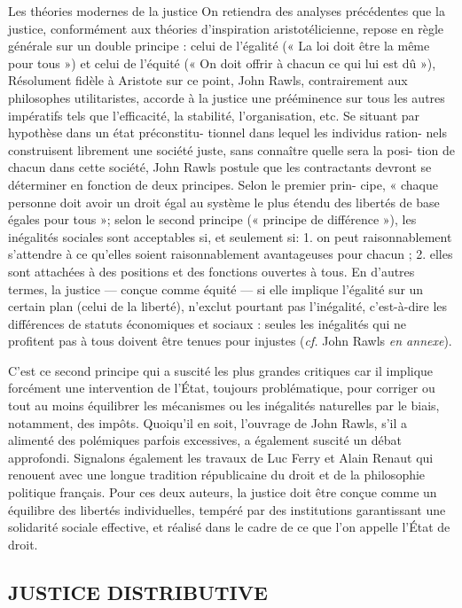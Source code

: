 Les théories modernes de la justice
On retiendra des analyses précédentes
que la justice, conformément aux théories d'inspiration aristotélicienne, repose
en règle générale sur un double principe : celui de l'égalité (« La loi doit être
la même pour tous ») et celui de l’équité
(« On doit offrir à chacun ce qui lui est
dû »), Résolument fidèle à Aristote sur ce
point, John Rawls, contrairement aux
philosophes utilitaristes, accorde à la
justice une prééminence sur tous les
autres impératifs tels que l'efficacité, la
stabilité, l’organisation, etc. Se situant
par hypothèse dans un état préconstitu-
tionnel dans lequel les individus ration-
nels construisent librement une société
juste, sans connaître quelle sera la posi-
tion de chacun dans cette société, John
Rawls postule que les contractants
devront se déterminer en fonction de
deux principes. Selon le premier prin-
cipe, « chaque personne doit avoir un
droit égal au système le plus étendu des
libertés de base égales pour tous »;
selon le second principe (« principe de
différence »), les inégalités sociales sont
acceptables si, et seulement si: 1. on
peut raisonnablement s'attendre à ce
qu'elles soient raisonnablement avantageuses pour chacun ; 2. elles sont attachées à des positions et des fonctions
ouvertes à tous. En d'autres termes, la
justice — conçue comme équité — si
elle implique l'égalité sur un certain plan
(celui de la liberté), n'exclut pourtant
pas l'inégalité, c'est-à-dire les différences
%
de statuts économiques et sociaux :
seules les inégalités qui ne profitent pas
à tous doivent être tenues pour injustes
({\it cf.} John Rawls {\it en annexe}).

C'est ce second principe qui a suscité les
plus grandes critiques car il implique
forcément une intervention de l'État,
toujours problématique, pour corriger
ou tout au moins équilibrer les mécanismes ou les inégalités naturelles par le
biais, notamment, des impôts. Quoiqu'il
en soit, l'ouvrage de John Rawls, s’il a
alimenté des polémiques parfois excessives, a également suscité un débat
approfondi. Signalons également les travaux de Luc Ferry et Alain Renaut qui
renouent avec une longue tradition
républicaine du droit et de la philosophie politique français. Pour ces deux
auteurs, la justice doit être conçue
comme un équilibre des libertés individuelles, tempéré par des institutions
garantissant une solidarité sociale effective,
%
 et réalisé dans le cadre de ce que
l'on appelle l'État de droit.

\subsection{JUSTICE DISTRIBUTIVE}

